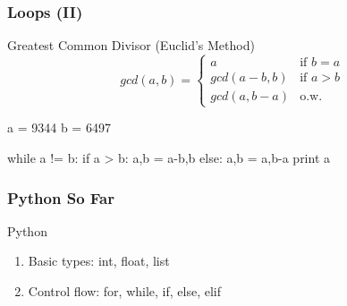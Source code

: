 \begin{frame}[fragile]
\frametitle{Loops (II)}

\begin{block}{Greatest Common Divisor (Euclid's Method)}
\[
gcd(a,b) = \begin{cases}
            a & \text{if $b = a$}\\
            gcd(a-b, b) & \text{if $a > b$} \\
            gcd(a, b-a) & \text{o.w.}
            \end{cases}
\]
\end{block}

\pause
\begin{python}
a = 9344
b = 6497

while a != b:
    if a > b:
        a,b = a-b,b
    else:
        a,b = a,b-a
print a
\end{python}

\end{frame}

\begin{frame}[fragile]
\frametitle{Python So Far}

\begin{block}{Python}
\begin{enumerate}
\item Basic types: int, float, list
\item Control flow: for, while, if, else, elif
\end{enumerate}
\end{block}

\end{frame}


